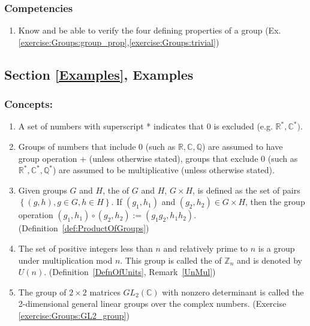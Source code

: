\subsubsection*{Competencies}
\begin{enumerate}
\item
Know and be able to verify the four defining properties of a group (Ex. \ref{exercise:Groups:group_prop},\ref{exercise:Groups:trivial})
\end{enumerate}


\subsection*{Section \ref{Examples}, Examples}
\subsubsection*{Concepts:}
\begin{enumerate}
\item
A set of numbers  with superscript * indicates that 0 is excluded  (e.g. $\mathbb{R}^{\ast},\mathbb{C}^{\ast})$.
\item
Groups of numbers that include 0 (such as ${\mathbb R}, {\mathbb C}, {\mathbb Q}$) are assumed to have group operation + (unless otherwise stated),  groups that exclude 0 (such as ${\mathbb R}^{\ast}, {\mathbb C}^{\ast}, {\mathbb Q}^{\ast}$) are assumed to be multiplicative (unless otherwise stated).
\item
Given groups $G$ and $H$, the  of $G$ and $H$, $G \times H$, is defined as the set of pairs $\left\{(g,h), g \in G, h \in H \right\}$.  If $(g_1, h_1)$ and $(g_2, h_2) \in G \times H$, then the group operation $(g_1, h_1) \circ (g_2, h_2) := (g_1g_2, h_1h_2)$. (Definition~\ref{def:ProductOfGroups})
\item
The set of positive integers less than $n$ and relatively prime to $n$ is a group under multiplication mod $n$. This group is called the  of ${\mathbb Z}_n$  and is denoted by $U(n)$.  (Definition~\ref{DefnOfUnits}, Remark~\ref{UnMul})
\item
The group of $2 \times 2$ matrices $GL_2({\mathbb C})$ with nonzero determinant is called the 2-dimensional general linear groups over the complex numbers. (Exercise \ref{exercise:Groups:GL2_group})
\end{enumerate}

